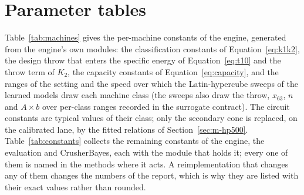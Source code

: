 \section{Parameter tables}\label{app:params}

Table~\ref{tab:machines} gives the per-machine constants of the engine, generated from the engine's own modules: the classification constants of
Equation~\eqref{eq:k1k2}, the design throw that enters the specific energy of Equation~\eqref{eq:t10} and the throw term of $K_2$, the capacity
constants of Equation~\eqref{eq:capacity}, and the ranges of the setting and the speed over which the Latin-hypercube sweeps of the learned models
draw each machine class (the sweeps also draw the throw, $x_{63}$, $n$ and $A\times b$ over per-class ranges recorded in the surrogate contract). The
circuit constants are typical values of their class; only the secondary cone is replaced, on the calibrated lane, by the fitted relations of
Section~\ref{sec:m-hp500}. Table~\ref{tab:constants} collects the remaining constants of the engine, the evaluation and CrusherBayes, each with the module
that holds it; every one of them is named in the methods where it acts. A reimplementation that changes any of them changes the numbers of the report,
which is why they are listed with their exact values rather than rounded.

\begin{table}[!t]
\centering
\caption{Per-machine constants of the engine, generated from \texttt{classification.py}, \texttt{capacity.py}, \texttt{machines.py} and \texttt{sweep.py}:
classification constants, design throw, reference capacity, optimum speed, reference gap, and the setting and speed ranges of the learned-model sweeps.}
\label{tab:machines}
\scriptsize

\end{table}

